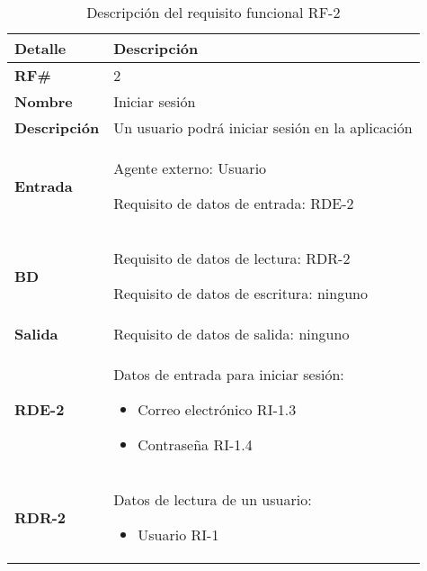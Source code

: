 \begin{table}[H]
    \centering
    \begin{tabular}{|p{3cm}|p{8cm}|}
        \hline
        \rowcolor{lightgray}
        \textbf{Detalle} & \textbf{Descripción} \\
        \hline
        \textbf{RF\#} & 2 \\
        \hline
        \textbf{Nombre} & Iniciar sesión \\
        \hline
        \textbf{Descripción} & Un usuario podrá iniciar sesión en la aplicación \\
        \hline
        \textbf{Entrada} &
        Agente externo: Usuario
        
        Requisito de datos de entrada: RDE-2 \\
        \hline
        \textbf{BD} &
        Requisito de datos de lectura: RDR-2
        
        Requisito de datos de escritura: ninguno \\
        \hline
        \textbf{Salida} & Requisito de datos de salida: ninguno \\
        \hline
        \textbf{RDE-2} & Datos de entrada para iniciar sesión:
            \begin{itemize}
                \item Correo electrónico RI-1.3
                \item Contraseña RI-1.4
            \end{itemize} \\
        \hline
        \textbf{RDR-2} & Datos de lectura de un usuario:
            \begin{itemize}
                \item Usuario RI-1
            \end{itemize} \\
        \hline
    \end{tabular}
    \caption{Descripción del requisito funcional RF-2}
    \label{tab:rf-2}
\end{table}

